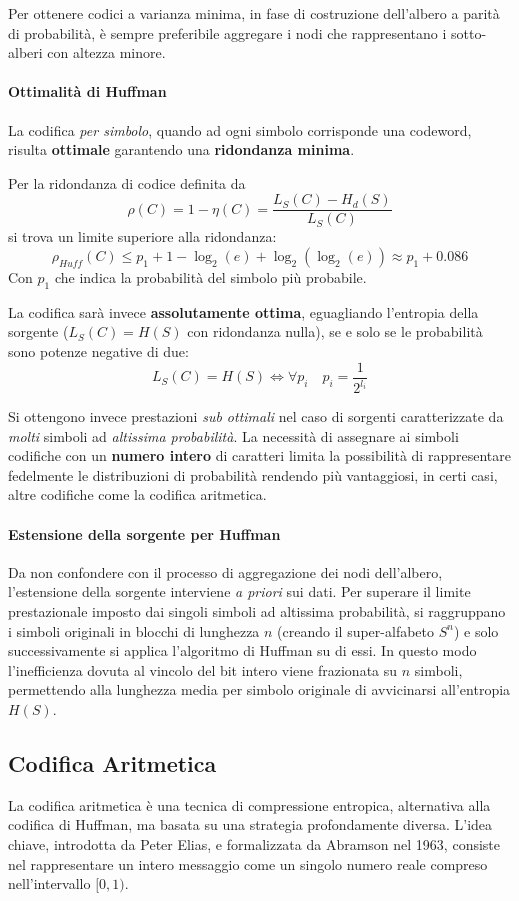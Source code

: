 Per ottenere codici a varianza minima, in fase di costruzione dell'albero a parità di probabilità, è sempre preferibile aggregare i nodi che rappresentano i sotto-alberi con altezza minore.

\paragraph{Ottimalità di Huffman}
La codifica \textit{per simbolo}, quando ad ogni simbolo corrisponde una codeword, risulta \textbf{ottimale} garantendo una \textbf{ridondanza minima}.

Per la ridondanza di codice definita da
\[\rho(C) = 1 - \eta(C)= \frac{L_S(C)-H_d(S)}{L_S(C)}\]
si trova un limite superiore alla ridondanza:
\[\rho_{Huff}(C) \leq p_1 + 1 - \log_2(e) + \log_2(\log_2(e)) \approx p_1 + 0.086\]
Con $p_1$ che indica la probabilità del simbolo più probabile.

La codifica sarà invece \textbf{assolutamente ottima}, eguagliando l'entropia della sorgente ($L_S(C) = H(S)$ con ridondanza nulla), se e solo se le probabilità sono potenze negative di due:
\[ L_S(C) = H(S) \iff \forall p_i \quad p_i = \frac{1}{2^{l_i}} \]

Si ottengono invece prestazioni \textit{sub ottimali} nel caso di sorgenti caratterizzate da \textit{molti} simboli ad \textit{altissima probabilità}. La necessità di assegnare ai simboli codifiche con un \textbf{numero intero} di caratteri limita la possibilità di rappresentare fedelmente le distribuzioni di probabilità rendendo più vantaggiosi, in certi casi, altre codifiche come la codifica aritmetica.

\paragraph{Estensione della sorgente per Huffman}
Da non confondere con il processo di aggregazione dei nodi dell'albero, l'estensione della sorgente interviene \textit{a priori} sui dati. Per superare il limite prestazionale imposto dai singoli simboli ad altissima probabilità, si raggruppano i simboli originali in blocchi di lunghezza $n$ (creando il super-alfabeto $S^n$) e solo successivamente si applica l'algoritmo di Huffman su di essi. In questo modo l'inefficienza dovuta al vincolo del bit intero viene frazionata su $n$ simboli, permettendo alla lunghezza media per simbolo originale di avvicinarsi all'entropia $H(S)$.


\subsection{Codifica Aritmetica}
La codifica aritmetica è una tecnica di compressione entropica, alternativa alla codifica di Huffman, ma basata su una strategia profondamente diversa. L'idea chiave, introdotta da Peter Elias, e formalizzata da Abramson nel 1963, consiste nel rappresentare un intero messaggio come un singolo numero reale compreso nell'intervallo $[0,1)$. 

